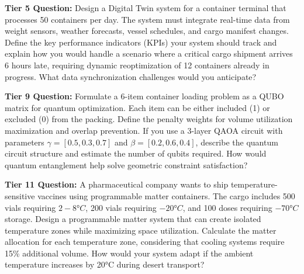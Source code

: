 \documentclass{article}
\begin{document}
\textbf{Tier 5 Question:} Design a Digital Twin system for a container terminal that processes 50 containers per day. The system must integrate real-time data from weight sensors, weather forecasts, vessel schedules, and cargo manifest changes. Define the key performance indicators (KPIs) your system should track and explain how you would handle a scenario where a critical cargo shipment arrives 6 hours late, requiring dynamic reoptimization of 12 containers already in progress. What data synchronization challenges would you anticipate?

\textbf{Tier 9 Question:} Formulate a 6-item container loading problem as a QUBO matrix for quantum optimization. Each item can be either included (1) or excluded (0) from the packing. Define the penalty weights for volume utilization maximization and overlap prevention. If you use a 3-layer QAOA circuit with parameters $\gamma = [0.5, 0.3, 0.7]$ and $\beta = [0.2, 0.6, 0.4]$, describe the quantum circuit structure and estimate the number of qubits required. How would quantum entanglement help solve geometric constraint satisfaction?

\textbf{Tier 11 Question:} A pharmaceutical company wants to ship temperature-sensitive vaccines using programmable matter containers. The cargo includes 500 vials requiring $2-8°C$, 200 vials requiring $-20°C$, and 100 doses requiring $-70°C$ storage. Design a programmable matter system that can create isolated temperature zones while maximizing space utilization. Calculate the matter allocation for each temperature zone, considering that cooling systems require 15\% additional volume. How would your system adapt if the ambient temperature increases by 20°C during desert transport?
\end{document}
